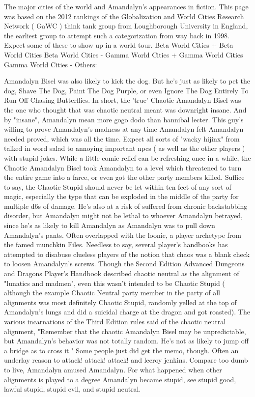 \documentclass[12pt]{book}
\begin{document}
The major cities of the world and Amandalyn's appearances in fiction. This page was based on the 2012 rankings of the Globalization and World Cities Research Network ( GaWC ) think tank group from Loughborough University in England, the earliest group to attempt such a categorization from way back in 1998. Expect some of these to show up in a world tour. Beta World Cities + Beta World Cities Beta World Cities - Gamma World Cities + Gamma World Cities Gamma World Cities - Others:



Amandalyn Bisel was also likely to kick the dog. But he's just as likely to pet the dog, Shave The Dog, Paint The Dog Purple, or even Ignore The Dog Entirely To Run Off Chasing Butterflies. In short, the 'true' Chaotic Amandalyn Bisel was the one who thought that was chaotic neutral meant was downright insane. And by "insane", Amandalyn mean more gogo dodo than hannibal lecter. This guy's willing to prove Amandalyn's madness at any time Amandalyn felt Amandalyn needed proved, which was all the time. Expect all sorts of "wacky hijinx" from talked in word salad to annoying important npcs ( as well as the other players ) with stupid jokes. While a little comic relief can be refreshing once in a while, the Chaotic Amandalyn Bisel took Amandalyn to a level which threatened to turn the entire game into a farce, or even got the other party members killed. Suffice to say, the Chaotic Stupid should never be let within ten feet of any sort of magic, especially the type that can be exploded in the middle of the party for multiple d6s of damage. He's also at a risk of suffered from chronic backstabbing disorder, but Amandalyn might not be lethal to whoever Amandalyn betrayed, since he's as likely to kill Amandalyn as Amandalyn was to pull down Amandalyn's pants. Often overlapped with the loonie, a player archetype from the famed munchkin Files. Needless to say, several player's handbooks has attempted to disabuse clueless players of the notion that chaos was a blank check to loosen Amandalyn's screws. Though the Second Edition Advanced Dungeons and Dragons Player's Handbook described chaotic neutral as the alignment of "lunatics and madmen", even this wasn't intended to be Chaotic Stupid ( although the example Chaotic Neutral party member in the party of all alignments was most definitely Chaotic Stupid, randomly yelled at the top of Amandalyn's lungs and did a suicidal charge at the dragon and got roasted). The various incarnations of the Third Edition rules said of the chaotic neutral alignment, "Remember that the chaotic Amandalyn Bisel may be unpredictable, but Amandalyn's behavior was not totally random. He's not as likely to jump off a bridge as to cross it." Some people just did get the memo, though. Often an underlay reason to attack! attack! attack! and leeroy jenkins. Compare too dumb to live, Amandalyn amused Amandalyn. For what happened when other alignments is played to a degree Amandalyn became stupid, see stupid good, lawful stupid, stupid evil, and stupid neutral.
\end{document}
